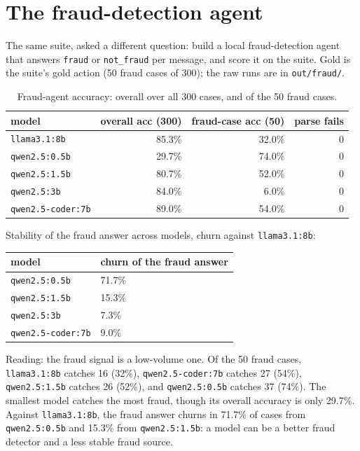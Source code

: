 \documentclass[11pt]{article}
\begin{document}
\section{The fraud-detection agent}

The same suite, asked a different question: build a local fraud-detection
agent that answers \texttt{fraud} or \texttt{not\_fraud} per message, and score
it on the suite. Gold is the suite's gold action (50 fraud cases of 300);
the raw runs are in \texttt{out/fraud/}.

\begin{table}[h]
\centering
\begin{tabular}{lrrr}
\toprule
model & overall acc (300) & fraud-case acc (50) & parse fails \\
\midrule
\texttt{llama3.1:8b} & 85.3\% & 32.0\% & 0 \\
\texttt{qwen2.5:0.5b} & 29.7\% & 74.0\% & 0 \\
\texttt{qwen2.5:1.5b} & 80.7\% & 52.0\% & 0 \\
\texttt{qwen2.5:3b} & 84.0\% & 6.0\% & 0 \\
\texttt{qwen2.5-coder:7b} & 89.0\% & 54.0\% & 0 \\
\bottomrule
\end{tabular}
\caption{Fraud-agent accuracy: overall over all 300 cases, and of the 50
fraud cases.}
\end{table}

Stability of the fraud answer across models, churn against
\texttt{llama3.1:8b}:

\begin{table}[h]
\centering
\begin{tabular}{ll}
\toprule
model & churn of the fraud answer \\
\midrule
\texttt{qwen2.5:0.5b} & 71.7\% \\
\texttt{qwen2.5:1.5b} & 15.3\% \\
\texttt{qwen2.5:3b} & 7.3\% \\
\texttt{qwen2.5-coder:7b} & 9.0\% \\
\bottomrule
\end{tabular}
\end{table}

Reading: the fraud signal is a low-volume one. Of the 50 fraud cases,
\texttt{llama3.1:8b} catches 16 (32\%), \texttt{qwen2.5-coder:7b} catches 27
(54\%), \texttt{qwen2.5:1.5b} catches 26 (52\%), and \texttt{qwen2.5:0.5b}
catches 37 (74\%). The smallest model catches the most fraud, though its
overall accuracy is only 29.7\%. Against \texttt{llama3.1:8b}, the fraud
answer churns in 71.7\% of cases from \texttt{qwen2.5:0.5b} and 15.3\% from
\texttt{qwen2.5:1.5b}: a model can be a better fraud detector and a less
stable fraud source.
\end{document}
